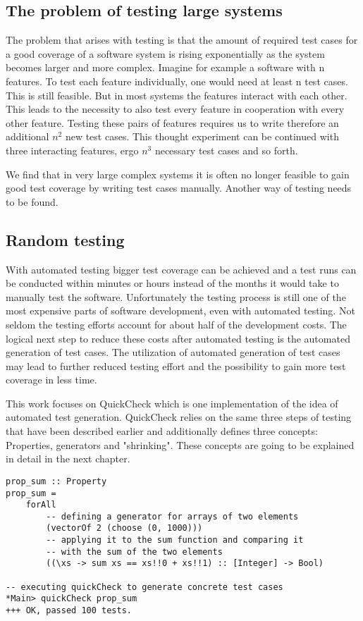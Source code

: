 \documentclass[a4paper, 12pt]{article} %
\begin{document}
\subsection{The problem of testing large systems}

The problem that arises with testing is that the amount of required test cases for a good coverage of a software system is rising exponentially as the system becomes larger and more complex. Imagine for example a software with n features. To test each feature individually, one would need at least n test cases. This is still feasible. But in most systems the features interact with each other. This leads to the necessity to also test every feature in cooperation with every other feature. Testing these pairs of features requires us to write therefore an additional $n^2$  new test cases. This thought experiment can be continued with three interacting features, ergo $n^3$ necessary test cases and so forth. \cite{Hughes2016}

We find that in very large complex systems it is often no longer feasible to gain good test coverage by writing test cases manually. Another way of testing needs to be found. 

\subsection{Random testing}

With automated testing bigger test coverage can be achieved and a test runs can be conducted within minutes or hours instead of the months it would take to manually test the software. Unfortunately the testing process is still one of the most expensive parts of software development, even with automated testing. Not seldom the testing efforts account for about half of the development costs. \cite{Claessen2000} The logical next step to reduce these costs after automated testing is the automated generation of test cases. The utilization of automated generation of test cases may lead to further reduced testing effort and the possibility to gain more test coverage in less time.

This work focuses on QuickCheck which is one implementation of the idea of automated test generation. QuickCheck relies on the same three steps of testing that have been described earlier and additionally defines three concepts: Properties, generators and "shrinking". These concepts are going to be explained in detail in the next chapter.

\begin{verbatim}
prop_sum :: Property
prop_sum = 
    forAll
        -- defining a generator for arrays of two elements
        (vectorOf 2 (choose (0, 1000)))
        -- applying it to the sum function and comparing it 
        -- with the sum of the two elements
        ((\xs -> sum xs == xs!!0 + xs!!1) :: [Integer] -> Bool)

-- executing quickCheck to generate concrete test cases
*Main> quickCheck prop_sum 
+++ OK, passed 100 tests.
\end{verbatim}
\end{document}
